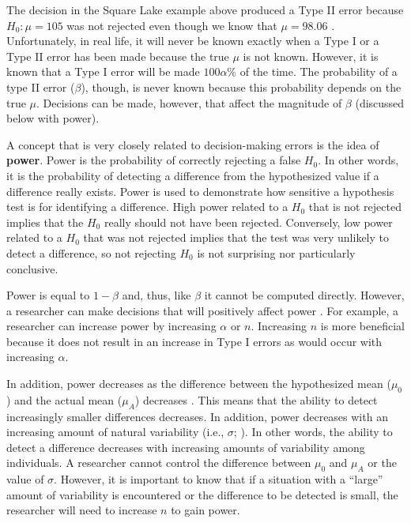 \documentclass[10pt,openany]{book}\usepackage[]{graphicx}\usepackage[]{color}
\begin{document}
The decision in the Square Lake example above produced a Type II error because $H_{0}:\mu=105$ was not rejected even though we know that $\mu=98.06$ . Unfortunately, in real life, it will never be known exactly when a Type I or a Type II error has been made because the true $\mu$ is not known. However, it is known that a Type I error will be made $100\alpha$\% of the time. The probability of a type II error ($\beta$), though, is never known because this probability depends on the true $\mu$. Decisions can be made, however, that affect the magnitude of $\beta$ (discussed below with power).

A concept that is very closely related to decision-making errors is the idea of \textbf{power}. Power is the probability of correctly rejecting a false $H_{0}$. In other words, it is the probability of detecting a difference from the hypothesized value if a difference really exists. Power is used to demonstrate how sensitive a hypothesis test is for identifying a difference. High power related to a $H_{0}$ that is not rejected implies that the $H_{0}$ really should not have been rejected. Conversely, low power related to a $H_{0}$ that was not rejected implies that the test was very unlikely to detect a difference, so not rejecting $H_{0}$ is not surprising nor particularly conclusive.

Power is equal to $1-\beta$ and, thus, like $\beta$ it cannot be computed directly. However, a researcher can make decisions that will positively affect power . For example, a researcher can increase power by increasing $\alpha$ or $n$. Increasing $n$ is more beneficial because it does not result in an increase in Type I errors as would occur with increasing $\alpha$.

In addition, power decreases as the difference between the hypothesized mean ($\mu_{0}$) and the actual mean ($\mu_{A}$) decreases . This means that the ability to detect increasingly smaller differences decreases. In addition, power decreases with an increasing amount of natural variability (i.e., $\sigma$; ). In other words, the ability to detect a difference decreases with increasing amounts of variability among individuals. A researcher cannot control the difference between $\mu_{0}$ and $\mu_{A}$ or the value of $\sigma$. However, it is important to know that if a situation with a ``large'' amount of variability is encountered or the difference to be detected is small, the researcher will need to increase $n$ to gain power.
\end{document}
